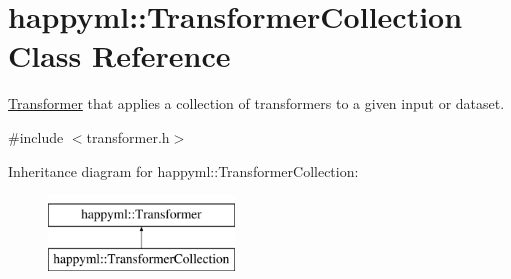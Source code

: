 \hypertarget{classhappyml_1_1TransformerCollection}{}\section{happyml\+:\+:Transformer\+Collection Class Reference}
\label{classhappyml_1_1TransformerCollection}


\hyperlink{classhappyml_1_1Transformer}{Transformer} that applies a collection of transformers to a given input or dataset.  




{\ttfamily \#include $<$transformer.\+h$>$}

Inheritance diagram for happyml\+:\+:Transformer\+Collection\+:\begin{figure}[H]
\begin{center}
\leavevmode
\includegraphics[height=2.000000cm]{classhappyml_1_1TransformerCollection}
\end{center}
\end{figure}
